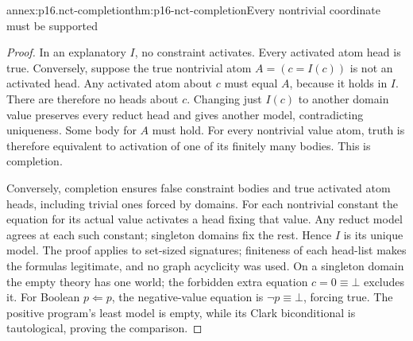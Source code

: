 \begin{annexitem}{annex:p16.nct-completion}{thm:p16-nct-completion}{Every nontrivial coordinate must be supported}
\begin{proof}
In an explanatory \(I\), no constraint activates.
Every activated atom head is true. Conversely, suppose the true nontrivial
atom \(A=(c=I(c))\) is not an activated head.
Any activated atom about \(c\) must equal \(A\), because it holds in \(I\).
There are therefore no heads about \(c\). Changing just \(I(c)\) to
another domain value preserves every reduct head and gives another model,
contradicting uniqueness. Some body for \(A\) must hold.
For every nontrivial value atom, truth is therefore equivalent to activation
of one of its finitely many bodies. This is completion.

Conversely, completion ensures false constraint bodies and true activated
atom heads, including trivial ones forced by domains.
For each nontrivial constant the equation for its actual value activates
a head fixing that value. Any reduct model agrees at each such constant;
singleton domains fix the rest. Hence \(I\) is its unique model.
The proof applies to set-sized signatures; finiteness of each head-list
makes the formulas legitimate, and no graph acyclicity was used.
On a singleton domain the empty theory has one world; the forbidden
extra equation \(c=0\equiv\bot\) excludes it.
For Boolean \(p\Leftarrow p\), the negative-value equation is
\(\neg p\equiv\bot\), forcing true. The positive program's least model is
empty, while its Clark biconditional is tautological, proving the comparison.
\end{proof}
\end{annexitem}

